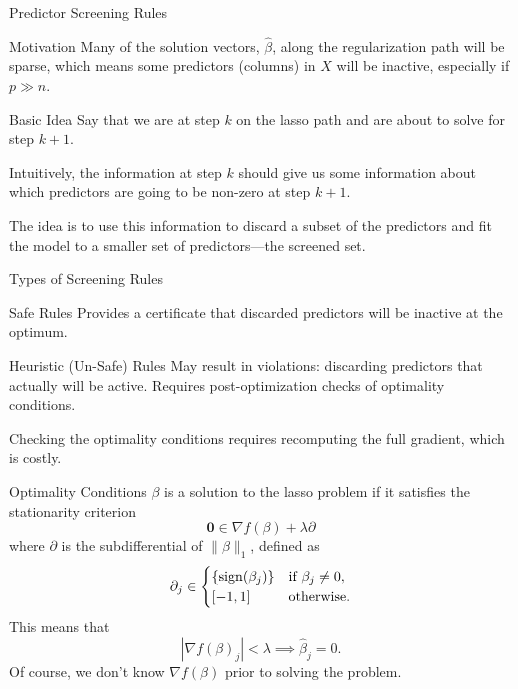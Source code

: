 \documentclass[10pt,ignorenonframetext]{beamer}
\begin{document}
\begin{frame}{Predictor Screening Rules}
  \begin{block}{Motivation}
    Many of the solution vectors, \(\hat\beta\),
    along the regularization path will be \alert{sparse}, which means some
    predictors (columns) in \(X\) will be \alert{inactive}, especially
    if \(p \gg n\).
  \end{block}
  \pause
  \begin{block}{Basic Idea}
    Say that we are at step \(k\) on the lasso path and are about to solve for
    step \(k + 1\). \medskip

    Intuitively, the information at step \(k\) should give us some information
    about which predictors are going to be non-zero at step \(k + 1\). \medskip

    The idea is to use this information to \alert{discard} a subset of the
    predictors and fit the model to a smaller set of predictors---the screened
    set.
  \end{block}
\end{frame}

\begin{frame}{Types of Screening Rules}
  \begin{block}{Safe Rules}
    Provides a certificate that discarded predictors will be inactive at the
    optimum.
  \end{block}
  \pause
  \begin{block}{Heuristic (Un-Safe) Rules}
    May result in \alert{violations}: discarding predictors that actually will
    be active. Requires post-optimization checks of optimality conditions.
    \medskip

    Checking the optimality conditions requires recomputing the full gradient,
    which is costly.
  \end{block}
\end{frame}

\begin{frame}{Optimality Conditions}
  \(\beta\) is a solution to the lasso problem if it satisfies the stationarity
  criterion
  \[
    \boldsymbol{0} \in \nabla f(\beta) + \lambda \partial
  \]
  where \(\partial\) is the subdifferential of \(\lVert \beta \rVert_1\),
  defined as
  \[
    \partial_j \in
    \begin{cases}
      \{\operatorname{sign}(\beta_j)\} & \text{if } \beta_j \neq 0, \\
      [-1,1]             & \text{otherwise.}
    \end{cases}
  \]
  \pause
  This means that
  \[
    |\nabla f(\beta)_j| < \lambda \implies \hat\beta_j = 0.
  \]
  Of course, we don't know \(\nabla f(\beta)\) prior to solving the problem.

\end{frame}
\end{document}
